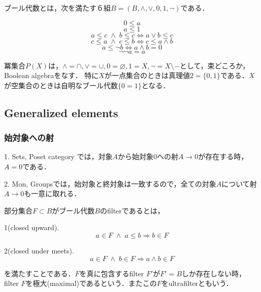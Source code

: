 \documentclass[uplatex, 12pt, dvipdfmx]{jsarticle}
\begin{document}
\begin{definition*}
    ブール代数とは，次を満たす６組$B=(B,\land,\lor,0,1,\lnot)$である．

    \[ 0\le a \]
    \[ a\le 1 \]
    \[ a\le c\;\land\; b\le c\Leftrightarrow a\lor b\le c \]
    \[ c\le a \;\land\; c\le b \Leftrightarrow c\le a\land b \]
    \begin{equation}\label{formula-BooleanAlgebra-introduction-of-not}
        a\le\lnot b\Leftrightarrow a\land b=0
    \end{equation}
    \begin{equation}\label{formula-BooleanAlgebra-excluded-middle}
        \lnot\lnot a=a
    \end{equation}
\end{definition*}
\vspace{1cm}
\begin{example*}
    冪集合$P(X)$は，$\land=\cap, \lor=\cup, 0=\varnothing, 1=X, \lnot=X\setminus -$として，束どころか，Boolean algebraをなす．
    特に$X$が一点集合のときは真理値$2=\{0,1\}$である．$X$が空集合のときは自明なブール代数$\{0=1\}$となる．
\end{example*}
\vspace{1cm}

\subsection{Generalized elements}

\subsubsection*{始対象への射}

\begin{example*}
    1. Sets, Poset category では，対象$A$から始対象$0$への射$A\to 0$が存在する時，$A= 0$である．

    \vspace{1cm}

    2. Mon, Groupsでは，始対象と終対象は一致するので，全ての対象$A$について射$A\to 0$も一意に取れる．
\end{example*}

\vspace{1cm}

\begin{definition*}[ultrafilter]
    部分集合$F\subset B$がブール代数$B$のfilterであるとは，

    1(closed upward). \begin{equation}\label{formula-BAfilter-closed-upward}
        a\in F\;\land\; a\le b\Rightarrow b\in F
    \end{equation}

    2(closed under meets). \begin{equation}\label{formula-BAfilter-closed-under-meets}
        a\in F\;\land\; b\in F\Rightarrow a\land b\in F
    \end{equation}

    を満たすことである．$F$を真に包含するfilter $F'$が$F'=B$しか存在しない時，filter $F$を極大(maximal)であるという．またこの$F$をultrafilterともいう．
\end{definition*}
\end{document}
